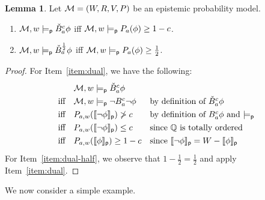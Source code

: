 \documentclass[12pt]{article}
\theoremstyle{definition}
\newtheorem{lemma}[theorem]{Lemma}
\newcommand{\Rat}{\mathbb{Q}}  %
\newcommand{\M}{{\cal M}}      %
\newcommand{\modelsp}{\models_{\mathsf{p}}}                  %
\newcommand{\semp}[1]{\llbracket{#1}\rrbracket_{\mathsf{p}}} %
\begin{document}
\begin{lemma}
  \label{lemma:dual}
  Let $\M=(W,R,V,P)$ be an epistemic probability model.
  \begin{enumerate}
  \item \label{item:dual} $\M,w\modelsp\check B_a^c\phi$ iff
    $\M,w\modelsp P_a(\phi)\geq 1-c$.

  \item \label{item:dual-half} $\M,w\modelsp\check B_a^{\frac 12}\phi$ iff
    $\M,w\modelsp P_a(\phi)\geq \frac 12$.

  \end{enumerate}
\end{lemma}
\begin{proof}
  For Item~\ref{item:dual}, we have the following:
  \[
  \renewcommand{\arraystretch}{1.3}
  \begin{array}{lll}
    &
    \M,w\modelsp\check B^c_a\phi
    \\
    \text{iff} &
    \M,w\modelsp\lnot B^c_a\lnot\phi 
    & \text{by definition of $\check B^c_a\phi$}
    \\
    \text{iff} &
    P_{a,w}(\semp{\lnot\phi})\not>c
    & \text{by definition of $B^c_a\phi$ and $\modelsp$}
    \\
    \text{iff} &
    P_{a,w}(\semp{\lnot\phi})\leq c
    & \text{since $\Rat$ is totally ordered}
    \\
    \text{iff} &
    P_{a,w}(\semp{\phi})\geq 1-c
    & \text{since $\semp{\lnot\phi}=W-\semp{\phi}$}
  \end{array}
  \]
  For Item~\ref{item:dual-half}, we observe that $1-\frac 12=\frac 12$
  and apply Item~\ref{item:dual}. 
\end{proof}


We now consider a simple example.
\end{document}
